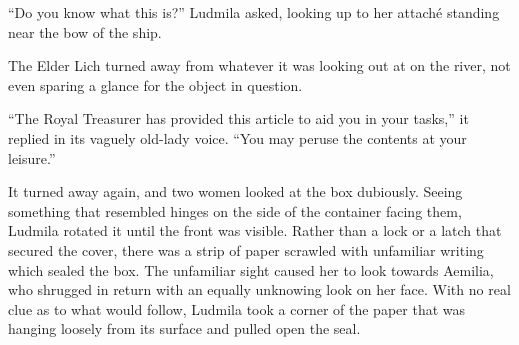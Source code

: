  

“Do you know what this is?” Ludmila asked, looking up to her attaché standing near the bow of the ship.

 

The Elder Lich turned away from whatever it was looking out at on the river, not even sparing a glance for the object in question.

 

“The Royal Treasurer has provided this article to aid you in your tasks,” it replied in its vaguely old-lady voice. “You may peruse the contents at your leisure.”

 

It turned away again, and two women looked at the box dubiously. Seeing something that resembled hinges on the side of the container facing them, Ludmila rotated it until the front was visible. Rather than a lock or a latch that secured the cover, there was a strip of paper scrawled with unfamiliar writing which sealed the box. The unfamiliar sight caused her to look towards Aemilia, who shrugged in return with an equally unknowing look on her face. With no real clue as to what would follow, Ludmila took a corner of the paper that was hanging loosely from its surface and pulled open the seal.